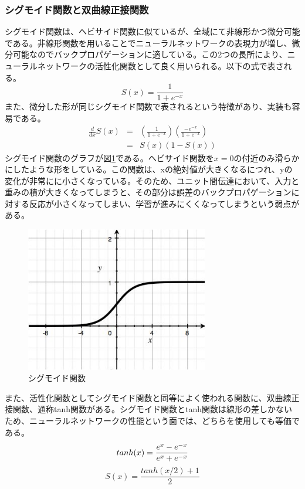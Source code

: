\subsubsection{シグモイド関数と双曲線正接関数}
シグモイド関数は、ヘビサイド関数に似ているが、全域にて非線形かつ微分可能である。非線形関数を用いることでニューラルネットワークの表現力が増し、微分可能なのでバックプロパゲーションに適している。この2つの長所により、ニューラルネットワークの活性化関数として良く用いられる。以下の式で表される。%
\begin{equation}
S(x) = \frac{1}{1+e^{-x}}
\end{equation}
また、微分した形が同じシグモイド関数で表されるという特徴があり、実装も容易である。
\begin{eqnarray}
\frac{d}{dx}S(x) &=& \left( \frac{1}{1+e^{-x}} \right) \left( \frac{-e^{-x}}{1+e^{-x}} \right)\\
&=& S(x)(1-S(x))
\end{eqnarray}
シグモイド関数のグラフが図\ref{c3_sigmoid}である。ヘビサイド関数を$x=0$の付近のみ滑らかにしたような形をしている。この関数は、xの絶対値が大きくなるにつれ、yの変化が非常にに小さくなっている。そのため、ユニット間伝達において、入力と重みの積が大きくなってしまうと、その部分は誤差のバックプロパゲーションに対する反応が小さくなってしまい、学習が進みにくくなってしまうという弱点がある。%
\begin{figure}[tbp]
 \centering
  \includegraphics[width=80mm]{img/c3/sigmoid}
 \caption{シグモイド関数}
 \label{c3_sigmoid}
\end{figure}
また、活性化関数としてシグモイド関数と同等によく使われる関数に、双曲線正接関数、通称tanh関数がある。シグモイド関数とtanh関数は線形の差しかないため、ニューラルネットワークの性能という面では、どちらを使用しても等価である。
\begin{equation}
tanh(x) = \frac{e^x-e^{-x}}{e^x+e^{-x}} \\\\
\end{equation}
\begin{equation}
S(x) = \frac{tanh(x/2)+1}{2}
\end{equation}

